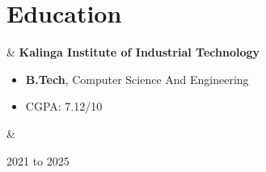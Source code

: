 \documentclass[10pt, letterpaper]{article}
\newenvironment{highlights}{
        \begin{itemize}[
                topsep=0pt,
                parsep=0.10 cm,
                partopsep=0pt,
                itemsep=0pt,
                after=\vspace{-1\baselineskip},
                leftmargin=0.4 cm + 3pt
            ]
    }{
        \end{itemize}
    } %
\let\originalTabularx\tabularx
\let\originalEndTabularx\endtabularx
\renewenvironment{tabularx}{\bgroup\centering\originalTabularx}{\originalEndTabularx\par\egroup}
\begin{document}
    
    \section{Education}

        \begin{tabularx}{
            \textwidth-0.4 cm-0.13cm
        }{
            L{0.85cm}
            K{0.2 cm}
            R{4.1 cm}
        }
            \textbf{}
            &
            \textbf{Kalinga Institute of Industrial Technology}

            \vspace{0.10 cm}

            \begin{highlights}
                \item \textbf{B.Tech}, Computer Science And Engineering
                \item CGPA: 7.12/10 
             
            \end{highlights}
            &
            

            2021 to 2025
        \end{tabularx}


    



                \item %




    
\end{document}
